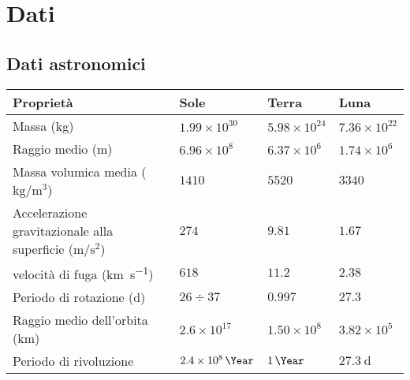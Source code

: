 \chapter{Dati}
\section{Dati astronomici}
\begin{tabular}{p{}lll}
    \toprule
    Proprietà                                                                    & Sole                 & Terra             & Luna   \\
    \midrule
    Massa (\si{\kilogram})                                                       & $1.99\times 10^{30}$ &
    $5.98\times 10^{24}$                                                         & $7.36\times
    10^{22}$                                                                                                                         \\
    Raggio medio (\si{\meter})                                                   & $6.96\times 10^8$    & $6.37\times
    10^6$                                                                        & $1.74\times
    10^6$                                                                                                                            \\
    Massa volumica media ($\si{\kilogram\per\meter^3}$)                             & $1410$               & $5520$            & $3340$ \\
    Accelerazione gravitazionale alla superficie ($\si{\meter\per\second\squared}$) & $274$                & $9.81$            & $1.67$ \\
    velocità di fuga (\si{\kilo\meter\per\second})                               & $618$                & $11.2$            & $2.38$ \\
    Periodo di rotazione (\si{\day})                                             & $26\div37$           & $0.997$           & $27.3$ \\
    Raggio medio dell'orbita (\si{\kilo\meter})                                  & $2.6\times
    10^{17}$                                                                     & $1.50\times 10^8$    & $3.82\times 10^5$          \\
    Periodo di rivoluzione                                                       & $\SI{2.4E8}{\Year}$  &
    $\SI{1}{\Year}$                                                              & $\SI{27.3}{\day}$                                 \\
    \bottomrule
\end{tabular}
